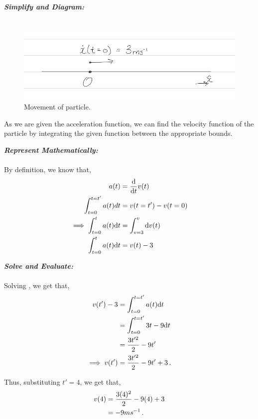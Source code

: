 \begin{subquestions}
\begin{subsubquestions}
	
\textbf{\textit{Simplify and Diagram:}} \\ \\
\begin{figure}[H]
	\begin{center}
		\includegraphics[scale=0.25]{../2009/figures/2009q6-1}
		\caption{\label{2009:q6:Diagram1} Movement of particle.}
	\end{center}
\end{figure}
As we are given the acceleration function, we can find the velocity function of the particle by integrating the given function between the appropriate bounds.




\textbf{\textit{Represent Mathematically:}} \\ \\
By definition, we know that,
\begin{align}
	a(t) & = \frac{\mathrm{d}}{\mathrm{d}t}v(t) \nonumber \\
	\int_{t=0}^{t=t^\prime} a(t) dt &= v(t=t^\prime) - v(t=0) \\
	\implies \int_{t=0}^{t}a(t)\mathrm{d} t & = \int_{v=3}^{v} \mathrm{d} v(t) \nonumber \\
	\int_{t=0}^{t}a(t)\mathrm{d} t & = v(t)-3 \label{2009:q6:VEqn1}
\end{align}



\textbf{\textit{Solve and Evaluate:}} \\ \\
Solving , we get that,
\begin{align}
	v(t')-3 & = \int_{t=0}^{t=t'}a(t)\mathrm{d} t \nonumber \\
	     & = \int_{t=0}^{t=t'} 3t-9 \mathrm{d} t \nonumber \\
	     & = \frac{3t'^2}{2}-9t' \nonumber \\
\implies v(t') & = \frac{3t'^2}{2}-9t' +3 \,.
\end{align}

Thus, substituting $t'=4$, we get that,
\begin{align}
	v(4) & = \frac{3(4)^2}{2}-9(4) +3 \nonumber \\
	     & = -9ms^{-1} \,.
\end{align}



\end{subsubquestions}
\end{subquestions}
